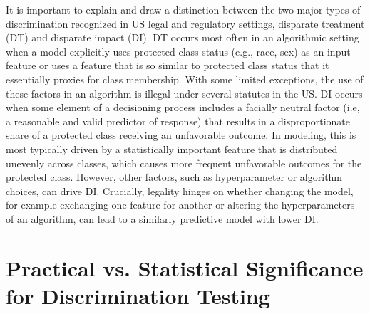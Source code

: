\documentclass[information,article,accept,moreauthors,pdftex]{Definitions/mdpi}
\begin{document}
It is important to explain and draw a distinction between the two major types of discrimination recognized in US legal and regulatory settings, disparate treatment (DT) and disparate impact (DI). DT occurs most often in an algorithmic setting when a model explicitly uses protected class status (e.g., race, sex) as an input feature or uses a feature that is so similar to protected class status that it essentially proxies for class membership.  With some limited exceptions, the use of these factors in an algorithm is illegal under several statutes in the US. DI occurs when some element of a decisioning process includes a {facially neutral} factor (i.e, a reasonable and valid predictor of response) that results in a disproportionate share of a protected class receiving an unfavorable outcome.  In modeling, this is most typically driven by a statistically important feature that is distributed unevenly across classes, which causes more frequent unfavorable outcomes for the protected class.  However, other factors, such as hyperparameter or algorithm choices, can drive DI.  Crucially, legality hinges on whether changing the model, for example exchanging one feature for another or altering the hyperparameters of an algorithm, can lead to a similarly predictive model with lower DI.

\section{Practical vs. Statistical Significance for Discrimination Testing}\label{a_sec:prac_v_stat}
\end{document}
